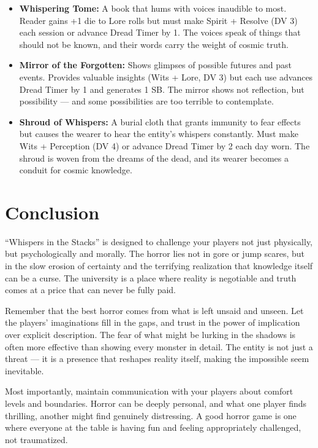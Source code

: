 \documentclass[11pt]{article}
\begin{document}
\begin{itemize}
\item \textbf{Whispering Tome:} A book that hums with voices inaudible to most. Reader gains +1 die to Lore rolls but must make Spirit + Resolve (DV 3) each session or advance Dread Timer by 1. The voices speak of things that should not be known, and their words carry the weight of cosmic truth.
\item \textbf{Mirror of the Forgotten:} Shows glimpses of possible futures and past events. Provides valuable insights (Wits + Lore, DV 3) but each use advances Dread Timer by 1 and generates 1 SB. The mirror shows not reflection, but possibility --- and some possibilities are too terrible to contemplate.
\item \textbf{Shroud of Whispers:} A burial cloth that grants immunity to fear effects but causes the wearer to hear the entity's whispers constantly. Must make Wits + Perception (DV 4) or advance Dread Timer by 2 each day worn. The shroud is woven from the dreams of the dead, and its wearer becomes a conduit for cosmic knowledge.
\end{itemize}

\section{Conclusion}

``Whispers in the Stacks'' is designed to challenge your players not just physically, but psychologically and morally. The horror lies not in gore or jump scares, but in the slow erosion of certainty and the terrifying realization that knowledge itself can be a curse. The university is a place where reality is negotiable and truth comes at a price that can never be fully paid.

Remember that the best horror comes from what is left unsaid and unseen. Let the players' imaginations fill in the gaps, and trust in the power of implication over explicit description. The fear of what might be lurking in the shadows is often more effective than showing every monster in detail. The entity is not just a threat --- it is a presence that reshapes reality itself, making the impossible seem inevitable.

Most importantly, maintain communication with your players about comfort levels and boundaries. Horror can be deeply personal, and what one player finds thrilling, another might find genuinely distressing. A good horror game is one where everyone at the table is having fun and feeling appropriately challenged, not traumatized.
\end{document}
